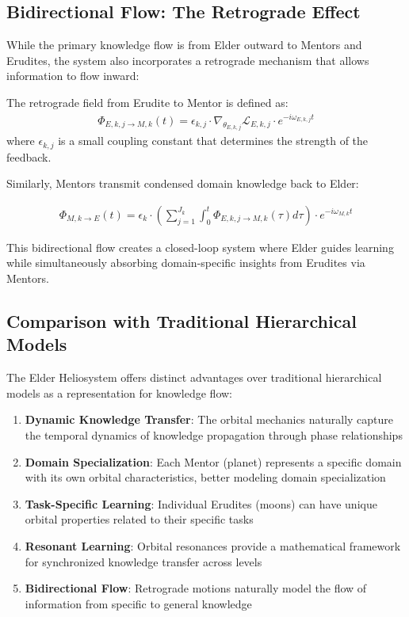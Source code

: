 \subsection{Bidirectional Flow: The Retrograde Effect}

While the primary knowledge flow is from Elder outward to Mentors and Erudites, the system also incorporates a retrograde mechanism that allows information to flow inward:

\begin{definition}
The retrograde field from Erudite to Mentor is defined as:
\begin{align}
\Phi_{E,k,j \rightarrow M,k}(t) = \epsilon_{k,j} \cdot \nabla_{\theta_{E,k,j}}\mathcal{L}_{E,k,j} \cdot e^{-i\omega_{E,k,j}t}
\end{align}
where $\epsilon_{k,j}$ is a small coupling constant that determines the strength of the feedback.
\end{definition}

Similarly, Mentors transmit condensed domain knowledge back to Elder:

\begin{align}
\Phi_{M,k \rightarrow E}(t) = \epsilon_k \cdot \left(\sum_{j=1}^{J_k} \int_0^t \Phi_{E,k,j \rightarrow M,k}(\tau) d\tau\right) \cdot e^{-i\omega_{M,k}t}
\end{align}

This bidirectional flow creates a closed-loop system where Elder guides learning while simultaneously absorbing domain-specific insights from Erudites via Mentors.

\subsection{Comparison with Traditional Hierarchical Models}

The Elder Heliosystem offers distinct advantages over traditional hierarchical models as a representation for knowledge flow:

\begin{enumerate}
    \item \textbf{Dynamic Knowledge Transfer}: The orbital mechanics naturally capture the temporal dynamics of knowledge propagation through phase relationships
    \item \textbf{Domain Specialization}: Each Mentor (planet) represents a specific domain with its own orbital characteristics, better modeling domain specialization
    \item \textbf{Task-Specific Learning}: Individual Erudites (moons) can have unique orbital properties related to their specific tasks
    \item \textbf{Resonant Learning}: Orbital resonances provide a mathematical framework for synchronized knowledge transfer across levels
    \item \textbf{Bidirectional Flow}: Retrograde motions naturally model the flow of information from specific to general knowledge
\end{enumerate}

